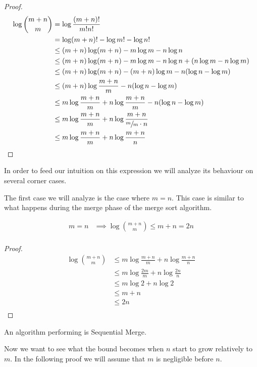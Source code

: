 \begin{proof}
\begin{align*}
\log\binom{m+n}{m} &= \log\frac{(m+n)!}{m!n!}\\
&= \log(m+n)! - \log m! - \log n!\\
&\leq (m+n) \log(m+n) - m \log m - n \log n\\
&\leq (m+n) \log(m+n) - m \log m - n \log n + (n \log m - n \log m)\\
&\leq (m+n) \log(m+n) - (m+n) \log m - n (\log n - \log m)\\
&\leq (m+n) \log\frac{m+n}{m} - n (\log n - \log m)\\
&\leq m \log\frac{m+n}{m} + n \log\frac{m+n}{m} - n (\log n - \log m)\\
&\leq m \log\frac{m+n}{m} + n \log\frac{m+n}{\sfrac{m}{m} \cdot n}\\
&\leq m \log\frac{m+n}{m} + n \log\frac{m+n}{n}\\
\end{align*}
\end{proof}



In order to feed our intuition on this expression we will analyze its behaviour
on several corner cases.


The first case we will analyze is the case where $m = n$. This case is similar
to what happens during the merge phase of the merge sort algorithm.

\begin{lemma}
\begin{align*}
m = n &\implies \log\binom{m+n}{m} \leq m + n = 2n\\
\end{align*}
\end{lemma}

\begin{proof}
\begin{align*}
\log\binom{m+n}{m} &\leq m \log\frac{m+n}{m} + n \log\frac{m+n}{n}\\
&\leq m \log\frac{2m}{m} + n \log\frac{2n}{n}\\
&\leq m \log 2 + n \log 2\\
&\leq m + n\\
&\leq 2n\\
\end{align*}
\end{proof}

An algorithm performing  is Sequential Merge.


Now we want to see what the bound becomes when $n$ start to grow relatively to
$m$. In the following proof we will assume that $m$ is negligible before $n$.


